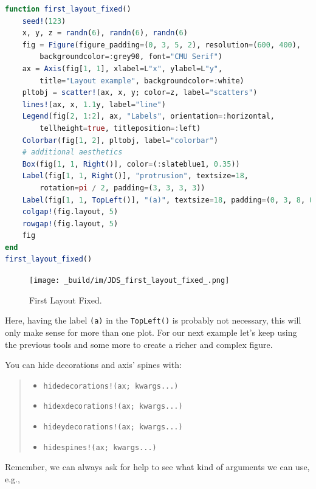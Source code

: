 \documentclass[
  notoc %
]{tufte-book}
\providecommand{\tightlist}{%
  \setlength{\itemsep}{0pt}\setlength{\parskip}{0pt}
}
\newcommand{\passthrough}[1]{#1}
\begin{document}
\begin{lstlisting}[language=Julia]
function first_layout_fixed()
    seed!(123)
    x, y, z = randn(6), randn(6), randn(6)
    fig = Figure(figure_padding=(0, 3, 5, 2), resolution=(600, 400),
        backgroundcolor=:grey90, font="CMU Serif")
    ax = Axis(fig[1, 1], xlabel=L"x", ylabel=L"y",
        title="Layout example", backgroundcolor=:white)
    pltobj = scatter!(ax, x, y; color=z, label="scatters")
    lines!(ax, x, 1.1y, label="line")
    Legend(fig[2, 1:2], ax, "Labels", orientation=:horizontal,
        tellheight=true, titleposition=:left)
    Colorbar(fig[1, 2], pltobj, label="colorbar")
    # additional aesthetics
    Box(fig[1, 1, Right()], color=(:slateblue1, 0.35))
    Label(fig[1, 1, Right()], "protrusion", textsize=18,
        rotation=pi / 2, padding=(3, 3, 3, 3))
    Label(fig[1, 1, TopLeft()], "(a)", textsize=18, padding=(0, 3, 8, 0))
    colgap!(fig.layout, 5)
    rowgap!(fig.layout, 5)
    fig
end
first_layout_fixed()
\end{lstlisting}

\begin{figure}
\hypertarget{fig:first_layout_fixed}{%
\centering
\texttt{[image: \_build/im/JDS\_first\_layout\_fixed\_.png]}
\caption{First Layout Fixed.}\label{fig:first_layout_fixed}
}
\end{figure}

Here, having the label \passthrough{\lstinline!(a)!} in the
\passthrough{\lstinline!TopLeft()!} is probably not necessary, this will
only make sense for more than one plot. For our next example let's keep
using the previous tools and some more to create a richer and complex
figure.

You can hide decorations and axis' spines with:

\begin{quote}
\begin{itemize}
\tightlist
\item
  \passthrough{\lstinline"hidedecorations!(ax; kwargs...)"}
\item
  \passthrough{\lstinline"hidexdecorations!(ax; kwargs...)"}
\item
  \passthrough{\lstinline"hideydecorations!(ax; kwargs...)"}
\item
  \passthrough{\lstinline"hidespines!(ax; kwargs...)"}
\end{itemize}
\end{quote}

Remember, we can always ask for help to see what kind of arguments we
can use, e.g.,
\end{document}
